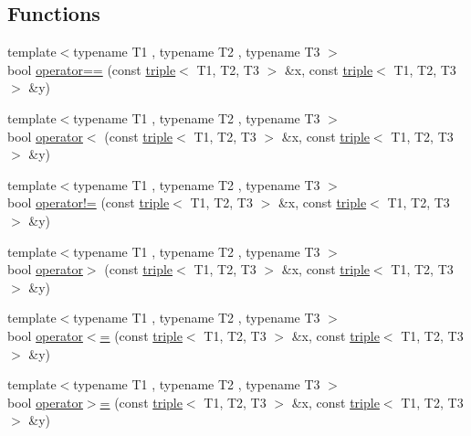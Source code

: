 \subsection*{Functions}
\begin{DoxyCompactItemize}
\item 
{\footnotesize template$<$typename T1 , typename T2 , typename T3 $>$ }\\bool \hyperlink{centroidalifold_2contrafold_2_utilities_8ipp_a9e90b0cdf49405cc0f56918fbeecae47}{operator==} (const \hyperlink{structtriple}{triple}$<$ T1, T2, T3 $>$ \&x, const \hyperlink{structtriple}{triple}$<$ T1, T2, T3 $>$ \&y)
\item 
{\footnotesize template$<$typename T1 , typename T2 , typename T3 $>$ }\\bool \hyperlink{centroidalifold_2contrafold_2_utilities_8ipp_af53bc7b3a1cb11396c78145a19591b23}{operator$<$} (const \hyperlink{structtriple}{triple}$<$ T1, T2, T3 $>$ \&x, const \hyperlink{structtriple}{triple}$<$ T1, T2, T3 $>$ \&y)
\item 
{\footnotesize template$<$typename T1 , typename T2 , typename T3 $>$ }\\bool \hyperlink{centroidalifold_2contrafold_2_utilities_8ipp_a14c9410b6dcc41a0f69c1479f30f164f}{operator!=} (const \hyperlink{structtriple}{triple}$<$ T1, T2, T3 $>$ \&x, const \hyperlink{structtriple}{triple}$<$ T1, T2, T3 $>$ \&y)
\item 
{\footnotesize template$<$typename T1 , typename T2 , typename T3 $>$ }\\bool \hyperlink{centroidalifold_2contrafold_2_utilities_8ipp_a593a75c25abcb081665eb3e13e138db0}{operator$>$} (const \hyperlink{structtriple}{triple}$<$ T1, T2, T3 $>$ \&x, const \hyperlink{structtriple}{triple}$<$ T1, T2, T3 $>$ \&y)
\item 
{\footnotesize template$<$typename T1 , typename T2 , typename T3 $>$ }\\bool \hyperlink{centroidalifold_2contrafold_2_utilities_8ipp_a8546112ccb3887f55cccb11caecbca4f}{operator$<$=} (const \hyperlink{structtriple}{triple}$<$ T1, T2, T3 $>$ \&x, const \hyperlink{structtriple}{triple}$<$ T1, T2, T3 $>$ \&y)
\item 
{\footnotesize template$<$typename T1 , typename T2 , typename T3 $>$ }\\bool \hyperlink{centroidalifold_2contrafold_2_utilities_8ipp_af2dfb1bb3969d1ba0df470c8ce42c7fa}{operator$>$=} (const \hyperlink{structtriple}{triple}$<$ T1, T2, T3 $>$ \&x, const \hyperlink{structtriple}{triple}$<$ T1, T2, T3 $>$ \&y)

\end{DoxyCompactItemize}
